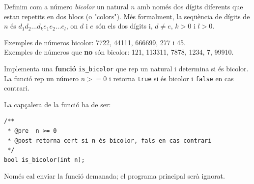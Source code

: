 
\Statement

Definim com a número \emph{bicolor} un natural $n$ amb només dos dígits diferents que estan repetits en dos blocs (o "colors"). Més formalment, la seqüència de dígits de $n$ és $d_1d_2\ldots d_ke_1e_2\ldots e_l$, on $d$ i $e$ són els dos dígits i, $d\neq e$, $k > 0$ i $l > 0$.

\medskip

Exemples de números bicolor: 7722, 44111, 666699, 277 i 45. \\
Exemples de números que \textbf{no} són bicolor: 121, 113311, 7878, 1234, 7, 99910.

\medskip

Implementa una \textbf{funció} \verb|is_bicolor| que rep un natural i determina si és bicolor. La funció rep un número $n >= 0$ i retorna \verb|true| si és bicolor i \verb|false| en cas contrari.

\medskip

La capçalera de la funció ha de ser:

\begin{verbatim}
/**
 * @pre  n >= 0
 * @post retorna cert si n és bicolor, fals en cas contrari
 */
bool is_bicolor(int n);
\end{verbatim}

\Observation

Només cal enviar la funció demanada; el programa principal serà ignorat.

